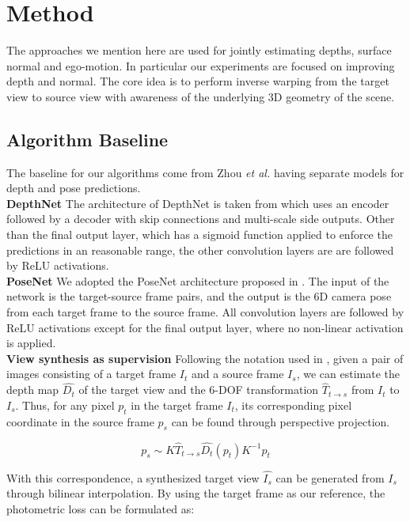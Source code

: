 \documentclass[10pt,twocolumn,letterpaper]{article}
\begin{document}
\section{Method}
The approaches we mention here are used for jointly estimating depths, surface normal and ego-motion. In particular our experiments are focused on improving depth and normal. The core idea is to perform inverse warping from the target view to source view with awareness of the underlying 3D geometry of the scene. 
\subsection{Algorithm Baseline}
The baseline for our algorithms come from Zhou \textit{et al.} \cite{zhou2017unsupervised} having separate models for depth and pose predictions. \\
\noindent \textbf{DepthNet} 
The architecture of DepthNet is taken from \cite{mayer2016dispnet} which uses an encoder followed by a decoder with skip connections and multi-scale side outputs. Other than the final output layer, which has a sigmoid function applied to enforce the predictions in an reasonable range, the other convolution layers are are followed by ReLU activations.\\  
\textbf{PoseNet}
We adopted the PoseNet architecture proposed in \cite{zhou2017unsupervised}. The input of the network is the target-source frame pairs, and the output is the 6D camera pose from each target frame to the source frame. All convolution layers are followed by ReLU activations except for the final output layer, where no non-linear activation is applied. 
\\
\textbf{View synthesis as supervision} 
Following the notation used in \cite{zhou2017unsupervised}, given a pair of images consisting of a target frame $I_t$ and a source frame $I_s$, we can estimate the depth map $\hat{D_t}$ of the target view and the 6-DOF transformation $\hat{T}_{t\xrightarrow{}s}$ from $I_t$ to $I_s$. Thus, for any pixel $p_t$ in the target frame $I_t$, its corresponding pixel coordinate in the source frame $p_s$ can be found through perspective projection. 

\begin{equation}
    p_s \sim K\hat{T}_{t\xrightarrow{}s}\hat{D_t}(p_t)K^{-1}p_t
\end{equation}

\noindent With this correspondence, a synthesized target view $\hat{I_s}$ can be generated from $I_s$ through bilinear interpolation. By using the target frame as our reference, the photometric loss can be formulated as:
\end{document}
